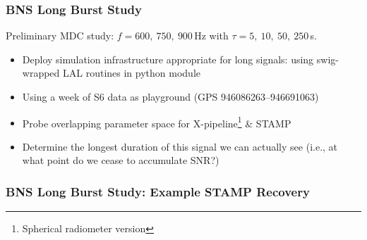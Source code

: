 \documentclass{beamer}
\begin{document}
\begin{frame}
    \frametitle{BNS Long Burst Study}
    Preliminary MDC study: $f=600,~750,~900$\,Hz with $\tau=5,~10,~50,~250$\,s.

    \begin{itemize}
        \item Deploy simulation infrastructure appropriate for long signals:
            using swig-wrapped LAL routines in python module
        \item Using a week of S6 data as playground (GPS 946086263--946691063)
        \item Probe overlapping parameter space for
            X-pipeline\footnote{Spherical radiometer version} \& STAMP
        \item Determine the longest duration of this signal we can actually see
            (i.e., at what point do we cease to accumulate SNR?)
    \end{itemize}

\end{frame}

\begin{frame}
    \frametitle{BNS Long Burst Study: Example STAMP Recovery}
    \begin{figure}
        \centering
    \end{figure}
\end{frame}
\end{document}
